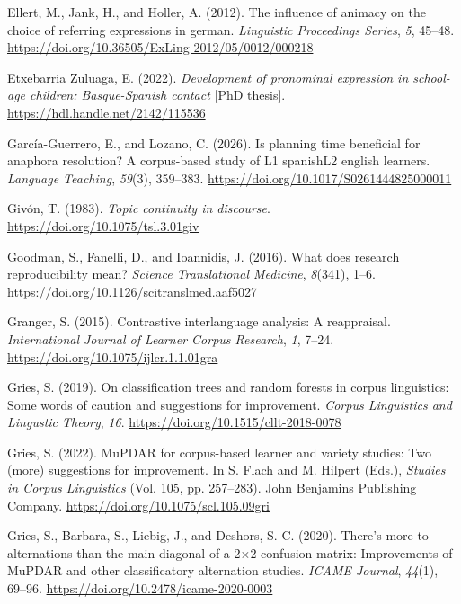 \documentclass[
  letterpaper,
  DIV=11,
  numbers=noendperiod]{scrartcl}
\newlength{\cslhangindent}
\newenvironment{CSLReferences}[2] %
 {\begin{list}{}{%
  \setlength{\itemindent}{0pt}
  \setlength{\leftmargin}{0pt}
  \setlength{\parsep}{0pt}
  \ifodd #1
   \setlength{\leftmargin}{\cslhangindent}
   \setlength{\itemindent}{-1\cslhangindent}
  \fi
  \setlength{\itemsep}{#2\baselineskip}}}
 {\end{list}}
\begin{document}
\begin{CSLReferences}{1}{0}
Ellert, M., Jank, H., and Holler, A. (2012). The influence of animacy on
the choice of referring expressions in german. \emph{Linguistic
Proceedings Series}, \emph{5}, 45--48.
\url{https://doi.org/10.36505/ExLing-2012/05/0012/000218}

Etxebarria Zuluaga, E. (2022). \emph{Development of pronominal
expression in school-age children: Basque-Spanish contact} {[}PhD
thesis{]}. \url{https://hdl.handle.net/2142/115536}

García-Guerrero, E., and Lozano, C. (2026). Is planning time beneficial
for anaphora resolution? A corpus-based study of L1
spanish{\textendash}L2 english learners. \emph{Language Teaching},
\emph{59}(3), 359--383. \url{https://doi.org/10.1017/S0261444825000011}

Givón, T. (1983). \emph{Topic continuity in discourse}.
\url{https://doi.org/10.1075/tsl.3.01giv}

Goodman, S., Fanelli, D., and Ioannidis, J. (2016). What does research
reproducibility mean? \emph{Science Translational Medicine},
\emph{8}(341), 1--6. \url{https://doi.org/10.1126/scitranslmed.aaf5027}

Granger, S. (2015). Contrastive interlanguage analysis: A reappraisal.
\emph{International Journal of Learner Corpus Research}, \emph{1},
7--24. \url{https://doi.org/10.1075/ijlcr.1.1.01gra}

Gries, S. (2019). On classification trees and random forests in corpus
linguistics: {Some} words of caution and suggestions for improvement.
\emph{Corpus Linguistics and Lingustic Theory}, \emph{16}.
\url{https://doi.org/10.1515/cllt-2018-0078}

Gries, S. (2022). {MuPDAR} for corpus-based learner and variety studies:
{Two} (more) suggestions for improvement. In S. Flach and M. Hilpert
(Eds.), \emph{Studies in {Corpus} {Linguistics}} (Vol. 105, pp.
257--283). John Benjamins Publishing Company.
\url{https://doi.org/10.1075/scl.105.09gri}

Gries, S., Barbara, S., Liebig, J., and Deshors, S. C. (2020). There's
more to alternations than the main diagonal of a 2×2 confusion matrix:
{Improvements} of {MuPDAR} and other classificatory alternation studies.
\emph{ICAME Journal}, \emph{44}(1), 69--96.
\url{https://doi.org/10.2478/icame-2020-0003}


\end{CSLReferences}
\end{document}
